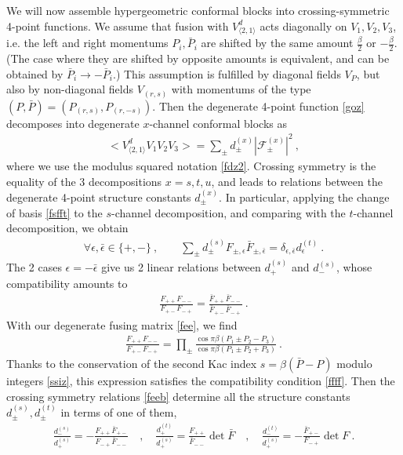 \documentclass[12pt, a4paper]{article}
\begin{document}
We will now assemble hypergeometric conformal blocks into crossing-symmetric 4-point functions. We assume that fusion with $V^d_{\langle 2,1\rangle}$ acts diagonally on $V_1,V_2,V_3$, i.e. the left and right momentums $P_i,\bar P_i$ are shifted by the same amount $\frac{\beta}{2}$ or $-\frac{\beta}{2}$. (The case where they are shifted by opposite amounts is equivalent, and can be obtained by $\bar P_i\to -\bar P_i$.) This assumption is fulfilled by diagonal fields $V_P$, but also by non-diagonal fields $V_{(r,s)}$ with momentums of the type $(P,\bar P)= (P_{(r,s)},P_{(r,-s)})$. 
Then the degenerate 4-point function \eqref{goz} decomposes into degenerate $x$-channel conformal blocks as 
\begin{align}
 \Big<V_{\langle 2,1\rangle}^dV_{1}V_{2}V_{3}\Big> 
 = \sum_\pm d^{(x)}_\pm \left|\mathcal{F}^{(x)}_\pm \right|^2  
 \ ,
\end{align}
where we use the modulus squared notation \eqref{fdz2}.
Crossing symmetry is the equality of the 3 decompositions $x=s,t,u$, and leads to relations between the degenerate 4-point structure constants $d^{(x)}_\pm$. In particular, applying the change of basis \eqref{fsfft} to the $s$-channel decomposition, and comparing with the $t$-channel decomposition, we obtain 
\begin{align}
 \forall \epsilon,\bar\epsilon \in \{+,-\}\ , \qquad \sum_\pm d_\pm^{(s)} F_{\pm,\epsilon}\bar F_{\pm, \bar\epsilon} = \delta_{\epsilon,\bar\epsilon} d_\epsilon^{(t)}\ . 
 \label{feeb}
\end{align}
The 2 cases $\epsilon = -\bar\epsilon$ give us 2 linear relations between $d^{(s)}_+$ and $d^{(s)}_-$, whose compatibility amounts to 
\begin{align}
 \frac{F_{++}F_{--}}{F_{+-}F_{-+}} = \frac{\bar F_{++}\bar F_{--}}{\bar F_{+-}\bar F_{-+}}\ .
 \label{ffff}
\end{align}
With our degenerate fusing matrix \eqref{fee}, we find 
\begin{align}
 \frac{F_{++}F_{--}}{F_{+-}F_{-+}} = \prod_\pm \frac{\cos \pi \beta(P_1\pm P_2-P_3)}{\cos \pi \beta(P_1\pm P_2+P_3)}\ . 
\end{align}
Thanks to the conservation of the second Kac index $s=\beta(\bar P-P)$ modulo integers \eqref{ssiz}, this expression satisfies the compatibility condition \eqref{ffff}. Then the crossing symmetry relations \eqref{feeb} determine all the structure constants $d^{(s)}_\pm,d^{(t)}_\pm$ in terms of one of them,
\begin{align}
 \frac{d^{(s)}_-}{d^{(s)}_+} = -\frac{F_{++}\bar F_{+-}}{F_{-+}\bar F_{--}}\quad , \quad 
 \frac{d^{(t)}_+}{d^{(s)}_+} = \frac{F_{++}}{\bar F_{--}} \det \bar F \quad , \quad 
 \frac{d^{(t)}_-}{d^{(s)}_+} = -\frac{\bar F_{+-}}{F_{-+}} \det F\ .
\end{align}
\end{document}
